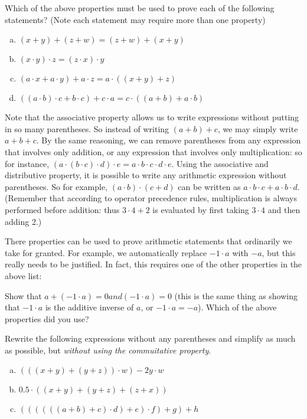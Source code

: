 \begin{exercise}{}
Which of the above properties must be used to prove each of the following statements? (Note each statement may require more than one property)
\begin{enumerate}[(a)]
\item
$(x+y)+(z+w) = (z+w)+(x+y)$
\item
$(x \cdot y) \cdot z = ( z \cdot  x) \cdot y$
\item
$(a\cdot x + a \cdot y) + a \cdot z = a \cdot ( (x+y) + z)$
\item
$((a \cdot b) \cdot c + b \cdot c) + c \cdot a = c \cdot ((a+b) + a \cdot b)$
\end{enumerate}
\end{exercise} 

Note that the associative property allows us to write expressions without putting in so many parentheses.  So instead of writing $(a+b)+c$, we may simply write $a+b+c$. By the same reasoning, we can remove parentheses from any expression that involves only addition, or any expression that involves only multiplication: so for instance, $(a \cdot (b \cdot c) \cdot d) \cdot e = a \cdot b \cdot c \cdot d \cdot e$. Using the associative and distributive property, it is possible to write any arithmetic expression without parentheses. So for example, $(a \cdot b) \cdot (c + d)$ can be written as $a \cdot b \cdot c + a \cdot b \cdot d$.  (Remember that according to operator precedence rules, multiplication is always performed before addition: thus $3 \cdot 4 + 2$ is evaluated by first taking $3 \cdot 4$ and then adding 2.)

There properties can be used to prove arithmetic statements that ordinarily we take for granted.  For example, we automatically replace $-1 \cdot a$ with $-a$, but this really needs to be justified. In fact, this requires one of the other properties in the above list:

\begin{exercise}{}
Show that $a + (-1 \cdot a) = 0 and (-1 \cdot a)=0$  (this is the same thing as showing that  $-1 \cdot a$ is the additive inverse of $a$, or $-1 \cdot a = -a$).  Which of the above properties did you use?
\end{exercise}

\begin{exercise}{}
Rewrite the following expressions without any parentheses and simplify as much as possible, but \emph{without using the commuitative property}.
\begin{enumerate}[(a)]
\item
$(((x + y) + (y+z))\cdot w) - 2y \cdot w$
\item
$0.5 \cdot ( (x+y) + (y + z) + (z + x))$
\item
$((((((a+b)+c) \cdot d)+ e) \cdot f) + g) + h$
\end{enumerate}
\end{exercise}

